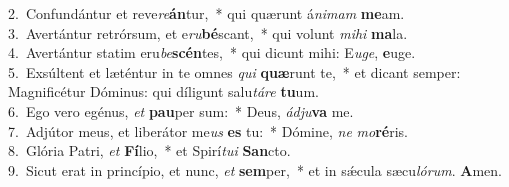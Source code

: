 {2.~}Confundántur et reve\textit{re}\textbf{án}tur,~* qui quærunt á\textit{ni}\textit{mam} \textbf{me}am.\\
{3.~}Avertántur retrórsum, et e\textit{ru}\textbf{bé}scant,~* qui volunt \textit{mi}\textit{hi} \textbf{ma}la.\\
{4.~}Avertántur statim eru\textit{be}\textbf{scén}tes,~* qui dicunt mihi: E\textit{u}\textit{ge}, \textbf{e}uge.\\
{5.~}Exsúltent et læténtur in te omnes \textit{qui} \textbf{quæ}runt te,~* et dicant semper: Magnificétur Dóminus: qui díligunt salu\textit{tá}\textit{re} \textbf{tu}um.\\
{6.~}Ego vero egénus, \textit{et} \textbf{pau}per sum:~* Deus, \textit{ád}\textit{ju}\textbf{va} me.\\
{7.~}Adjútor meus, et liberátor me\textit{us} \textbf{es} tu:~* Dómine, \textit{ne} \textit{mo}\textbf{ré}ris.\\
{8.~}Glória Patri, \textit{et} \textbf{Fí}lio,~* et Spirí\textit{tu}\textit{i} \textbf{San}cto.\\
{9.~}Sicut erat in princípio, et nunc, \textit{et} \textbf{sem}per,~* et in sǽcula sæcu\textit{ló}\textit{rum}. \textbf{A}men.\\
